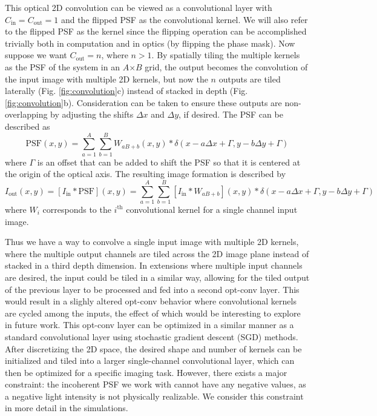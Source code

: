 \documentclass[fleqn,10pt]{wlscirep}
\begin{document}
This optical 2D convolution can be viewed as a convolutional layer with $C_\text{in} = C_\text{out} = 1$ and the flipped PSF as the convolutional kernel. We will also refer to the flipped PSF as the kernel since the flipping operation can be accomplished trivially both in computation and in optics (by flipping the phase mask). Now suppose we want $C_\text{out} = n$, where $n >1$. By spatially tiling the multiple kernels as the PSF of the system in an $A$$\times$$B$ grid, the output becomes the convolution of the input image with multiple 2D kernels, but now the $n$ outputs are tiled laterally (Fig. \ref{fig:convolution}c) instead of stacked in depth (Fig. \ref{fig:convolution}b). Consideration can be taken to ensure these outputs are non-overlapping by adjusting the shifts $\Delta x$ and $\Delta y$, if desired. The PSF can be described as
\begin{equation}
\text{PSF}(x,y) = \sum_{a = 1}^{A}\sum_{b = 1}^{B} W_{aB+b} (x,y) * \delta(x - a\Delta x + \Gamma, y - b\Delta y + \Gamma)
\end{equation}
where $\Gamma$ is an offset that can be added to shift the PSF so that it is centered at the origin of the optical axis. The resulting image formation is described by
\begin{equation} 
I_\text{out}(x,y) = [I_\text{in} * \text{PSF}](x,y) =\sum_{a = 1}^{A}\sum_{b = 1}^{B}  [I_\text{in} * W_{aB+b}](x,y) * \delta(x - a\Delta x + \Gamma, y - b \Delta y + \Gamma)
\end{equation}
where $W_{i}$ corresponds to the $i^\text{th}$ convolutional kernel for a single channel input image. 

Thus we have a way to convolve a single input image with multiple 2D kernels, where the multiple output channels are tiled across the 2D image plane instead of stacked in a third depth dimension. In extensions where multiple input channels are desired, the input could be tiled in a similar way, allowing for the tiled output of the previous layer to be processed and fed into a second opt-conv layer. This would result in a slighly altered opt-conv behavior where convolutional kernels are cycled among the inputs, the effect of which would be interesting to explore in future work. This opt-conv layer can be optimized in a similar manner as a standard convolutional layer using stochastic gradient descent (SGD) methods. After discretizing the 2D space, the desired shape and number of kernels can be initialized and tiled into a larger single-channel convolutional layer, which can then be optimized for a specific imaging task. However, there exists a major constraint: the incoherent PSF we work with cannot have any negative values, as a negative light intensity is not physically realizable. We consider this constraint in more detail in the simulations.
\end{document}
